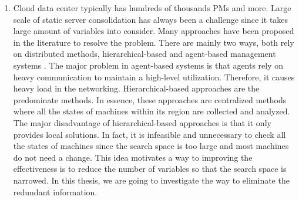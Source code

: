 \begin{enumerate}
\item Cloud data center typically has hundreds of thousands PMs and more. 
	Large scale of static server consolidation has always been a challenge since it takes large amount of variables
	into consider.
 	Many approaches have been proposed in the literature to resolve the problem. There are mainly two ways, both rely on distributed methods, hierarchical-based \cite{Jung:2010dt, Moens:2011gk} and agent-based management systems \cite{Yazir:2010bk}.
	The major problem in agent-based systems is that agents rely on heavy communication to maintain a high-level utilization. Therefore, it causes heavy load in the networking. Hierarchical-based approaches are the predominate methods. In essence, these approaches are centralized methods where all the states of machines within its region are collected and analyzed. The major disadvantage of hierarchical-based approaches is that it only provides local solutions. In fact, it is infeasible and unnecessary to check all the states of machines since the search space is too large and most machines do not need a change. This idea
	motivates a way to improving the effectiveness is to reduce the number of variables so that the search space is narrowed. In this thesis, we are going to investigate the way to eliminate the redundant information.
\end{enumerate}





